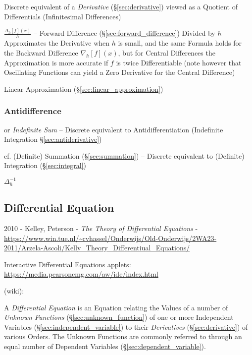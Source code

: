 \fist Discrete equivalent of a \emph{Derivative} (\S\ref{sec:derivative}) viewed
as a Quotient of Differentials (Infinitesimal Differences)

$\frac{\Delta_h[f](x)}{h}$ -- Forward Difference
(\S\ref{sec:forward_difference}) Divided by $h$ Approximates the Derivative when
$h$ is small, and the same Formula holds for the Backward Difference
$\nabla_h[f](x)$, but for Central Differences the Approximation is more accurate
if $f$ is twice Differentiable (note however that Oscillating Functions can
yield a Zero Derivative for the Central Difference)

Linear Approximation (\S\ref{sec:linear_approximation})



\subsubsection{Antidifference}\label{sec:antidifference}

or \emph{Indefinite Sum} -- Discrete equivalent to Antidifferentiation
(Indefinite Integration \S\ref{sec:antiderivative})

cf. (Definite) Summation (\S\ref{sec:summation}) -- Discrete equivalent to
(Definite) Integration (\S\ref{sec:integral})

$\Delta^{-1}_h$



\subsection{Differential Equation}\label{sec:differential_equation}

2010 - Kelley, Peterson - \emph{The Theory of Differential Equations} -
\url{https://www.win.tue.nl/~rvhassel/Onderwijs/Old-Onderwijs/2WA23-2011/Arzela-Ascoli/Kelly_Theory_Differentiual_Equations/}

Interactive Differential Equations applets:
\url{https://media.pearsoncmg.com/aw/ide/index.html}

(wiki):

A \emph{Differential Equation} is an Equation relating the Values of a number of
\emph{Unknown Functions} (\S\ref{sec:unknown_function}) of one or more
Independent Variables (\S\ref{sec:independent_variable}) to their
\emph{Derivatives} (\S\ref{sec:derivative}) of various Orders. The Unknown
Functions are commonly referred to through an equal number of Dependent
Variables (\S\ref{sec:dependent_variable}).

